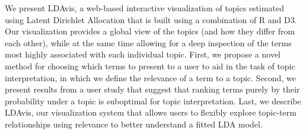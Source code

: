 We present LDAvis, a web-based interactive visualization of topics estimated using Latent Dirichlet Allocation that is built using a combination of R and D3. Our visualization provides a global view of the topics (and how they differ from each other), while at the same time allowing for a deep inspection of the terms most highly associated with each individual topic. First, we propose a novel method for choosing which terms to present to a user to aid in the task of topic interpretation, in which we define the relevance of a term to a topic. Second, we present results from a user study that suggest that ranking terms purely by their probability under a topic is suboptimal for topic interpretation. Last, we describe LDAvis, our visualization system that allows users to flexibly explore topic-term relationships using relevance to better understand a fitted LDA model.
